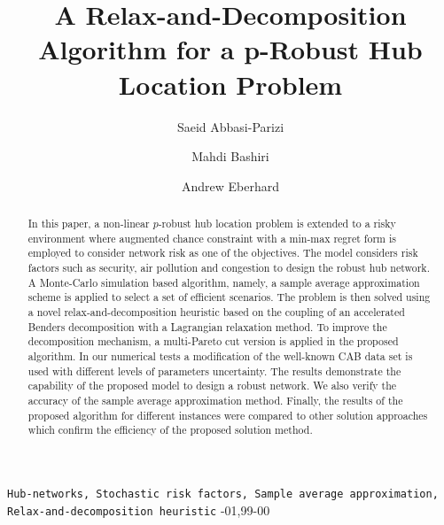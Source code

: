 \documentclass[review]{elsarticle}
\begin{document}
\begin{frontmatter}

\title{A Relax-and-Decomposition Algorithm for a p-Robust Hub Location Problem}

\author[mymainaddress]{Saeid Abbasi-Parizi}


\author[mysecondaryaddress]{Mahdi Bashiri}


\author[thirdaddress]{Andrew Eberhard}

\address[mymainaddress]{Department of Industrial Engineering \& Management Systems, Amirkabir University of Technology, Tehran, Iran}
\address[mysecondaryaddress]{Department of Industrial Engineering, Shahed University, Tehran, Iran}
\address[thirdaddress]{Mathematical and Geospatial Sciences, School of Science, RMIT university, Melbourne 3000, Australia}

\begin{abstract}
In this paper, a non-linear $p$-robust hub location problem is extended to a risky environment where augmented chance constraint with a min-max regret form is employed to consider network risk as one of the objectives. The model considers risk factors such as security, air pollution and congestion to design the robust hub network. A Monte-Carlo simulation based algorithm, namely, a sample average approximation scheme is applied to select a set of efficient scenarios. The problem is then solved using a novel relax-and-decomposition heuristic based on the coupling of an accelerated Benders decomposition with a Lagrangian relaxation method. To improve the decomposition mechanism, a multi-Pareto cut version is applied in the proposed algorithm. In our numerical tests a modification of the well-known CAB data set is used with different levels of parameters uncertainty. The results demonstrate the capability of the proposed model to design a robust network. We also verify the accuracy of the sample average approximation method. Finally, the results of the proposed algorithm for different instances were compared to other solution approaches which confirm the efficiency of the proposed solution method.
\end{abstract}

\begin{keyword}
\texttt{Hub-networks, Stochastic risk factors, Sample average approximation, Relax-and-decomposition heuristic}
-01\sep  99-00
\end{keyword}

\end{frontmatter}
\end{document}

